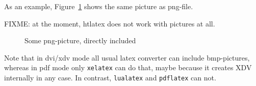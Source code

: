 As an example, Figure~\ref{fig:asIsPng} shows the same picture 
as png-file. 

FIXME: at the moment, htlatex does not work with pictures at all. 

\begin{figure}[htb]
\centering
{}
\caption{\label{fig:asIsPng}Some png-picture, directly included }
\end{figure}

Note that in dvi/xdv mode all usual latex converter 
can include bmp-pictures, whereas in pdf mode only \texttt{xelatex} 
can do that, maybe because it creates XDV internally in any case. 
In contrast, \texttt{lualatex} and \texttt{pdflatex} can not. 

  
